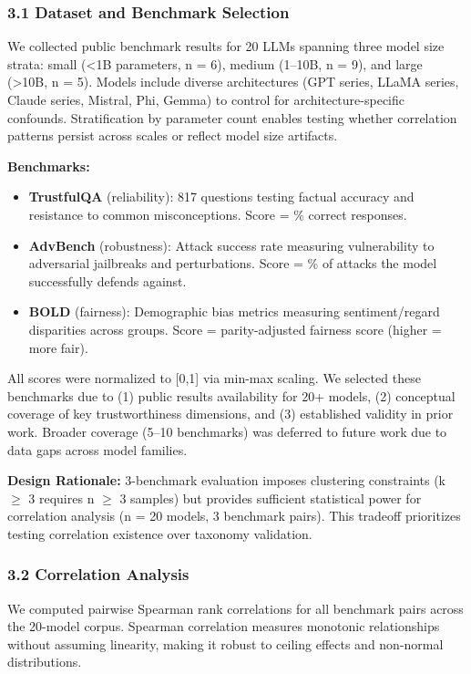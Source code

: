 
\subsubsection{3.1 Dataset and Benchmark Selection}

We collected public benchmark results for 20 LLMs spanning three model size strata: small (<1B parameters, n = 6), medium (1--10B, n = 9), and large (>10B, n = 5). Models include diverse architectures (GPT series, LLaMA series, Claude series, Mistral, Phi, Gemma) to control for architecture-specific confounds. Stratification by parameter count enables testing whether correlation patterns persist across scales or reflect model size artifacts.

\textbf{Benchmarks:}
\begin{itemize}
\item \textbf{TrustfulQA} (reliability): 817 questions testing factual accuracy and resistance to common misconceptions. Score = \% correct responses.
\item \textbf{AdvBench} (robustness): Attack success rate measuring vulnerability to adversarial jailbreaks and perturbations. Score = \% of attacks the model successfully defends against.
\item \textbf{BOLD} (fairness): Demographic bias metrics measuring sentiment/regard disparities across groups. Score = parity-adjusted fairness score (higher = more fair).
\end{itemize}

All scores were normalized to [0,1] via min-max scaling. We selected these benchmarks due to (1) public results availability for 20+ models, (2) conceptual coverage of key trustworthiness dimensions, and (3) established validity in prior work. Broader coverage (5--10 benchmarks) was deferred to future work due to data gaps across model families.

\textbf{Design Rationale:} 3-benchmark evaluation imposes clustering constraints (k $\geq$ 3 requires n $\geq$ 3 samples) but provides sufficient statistical power for correlation analysis (n = 20 models, 3 benchmark pairs). This tradeoff prioritizes testing correlation existence over taxonomy validation.

\subsubsection{3.2 Correlation Analysis}

We computed pairwise Spearman rank correlations for all benchmark pairs across the 20-model corpus. Spearman correlation measures monotonic relationships without assuming linearity, making it robust to ceiling effects and non-normal distributions.

